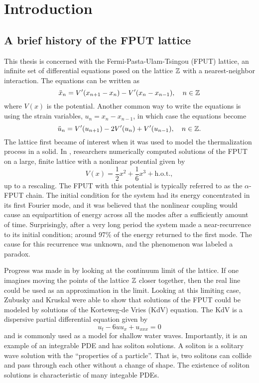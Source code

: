 
\chapter{Introduction}

\section{A brief history of the FPUT lattice}

This thesis is concerned with the Fermi-Pasta-Ulam-Tsingou (FPUT) lattice, an infinite set of differential equations posed on the lattice \(\mathbb{Z}\) with a nearest-neighbor interaction. The equations can be written as
\begin{equation}
	\ddot x_n = V'(x_{n+1}- x_n) - V'(x_n - x_{n-1}), \quad n\in \mathbb{Z}
\end{equation}
where \(V(x)\) is the potential. Another common way to write the equations is using the strain variables, \(u_n = x_ n - x_{n-1}\), in which case the equations become
\begin{equation}\label{fput-lattice-equations-strain-variables}
	\ddot{u}_n = V'(u_{n+1}) - 2 V'(u_n) + V'(u_{n-1}), \quad n \in \mathbb{Z}.
\end{equation}
The lattice first became of interest when it was used to model the thermalization process in a solid. In \cite{fermi1955studies}, researchers numerically computed solutions of the FPUT on a large, finite lattice with a nonlinear potential given by
\begin{equation}
	V(x) = \frac 1 2 x^2 + \frac 1 6 x^3 + \text{h.o.t.},
\end{equation}
up to a rescaling. The FPUT with this potential is typically referred to as the \(\alpha\)-FPUT chain. The initial condition for the system had its energy concentrated in its first Fourier mode, and it was believed that the nonlinear coupling would cause an equipartition of energy across all the modes after a sufficiently amount of time. Surprisingly, after a very long period the system made a near-recurrence to its initial condition; around 97\% of the energy returned to the first mode. The cause for this recurrence was unknown, and the phenomenon was labeled a paradox. 

Progress was made in  \cite{zabusky1965interaction} by looking at the continuum limit of the lattice. If one imagines moving the points of the lattice \(\mathbb{Z}\) closer together, then the real line could be used as an approximation in the limit. Looking at this limiting case, Zubusky and Kruskal were able to show that solutions of the FPUT could be modeled by solutions of the Korteweg-de Vries (KdV) equation. The KdV is a dispersive partial differential equation given by 
\begin{equation}
	u_t  - 6 u u_x  + u_{xxx}= 0
\end{equation}
and is commonly used as a model for shallow water waves. Importantly, it is an example of an integrable PDE and has soliton solutions. A soliton is a solitary wave solution with the ``properties of a particle''. That is, two solitons can collide and pass through each other without a change of shape. The existence of soliton solutions is characteristic of many integable PDEs.

